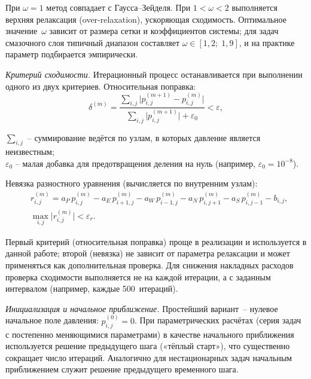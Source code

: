 При $\omega = 1$ метод совпадает с Гаусса–Зейделя. При $1 < \omega < 2$ выполняется верхняя релаксация (over-relaxation), ускоряющая сходимость. Оптимальное значение~$\omega$ зависит от размера сетки и коэффициентов системы; для задач смазочного слоя типичный диапазон составляет $\omega \in [1{,}2;\; 1{,}9]$, и на практике параметр подбирается эмпирически.

\textit{Критерий сходимости.}
Итерационный процесс останавливается при выполнении одного из двух критериев. Относительная поправка:
\begin{equation}\label{eq:convergence_change}
  \delta^{(m)} = \frac{\displaystyle\sum_{i,j} \bigl|p_{i,j}^{(m+1)} - p_{i,j}^{(m)}\bigr|}
       {\displaystyle\sum_{i,j} \bigl|p_{i,j}^{(m+1)}\bigr| + \varepsilon_0} < \varepsilon,
\end{equation}
\begin{conditions}
$\sum_{i,j}$ -- суммирование ведётся по узлам, в которых давление является неизвестным;\\
$\varepsilon_0$ -- малая добавка для предотвращения деления на нуль (например, $\varepsilon_0 = 10^{-8}$).
\end{conditions}
Невязка разностного уравнения (вычисляется по внутренним узлам):
\begin{equation}\label{eq:convergence_residual}
\begin{split}
  &r_{i,j}^{(m)} = a_P\,p_{i,j}^{(m)} - a_E\,p_{i+1,j}^{(m)} - a_W\,p_{i-1,j}^{(m)}
    - a_N\,p_{i,j+1}^{(m)} - a_S\,p_{i,j-1}^{(m)} - b_{i,j}, \\
  &\max_{i,j}\bigl|r_{i,j}^{(m)}\bigr| < \varepsilon_r.
\end{split}
\end{equation}

Первый критерий (относительная поправка) проще в реализации и используется в данной работе; второй (невязка) не зависит от параметра релаксации и может применяться как дополнительная проверка. Для снижения накладных расходов проверка сходимости выполняется не на каждой итерации, а с заданным интервалом (например, каждые 500~итераций).

\textit{Инициализация и начальное приближение.}
Простейший вариант~-- нулевое начальное поле давления: $p^{(0)}_{i,j} = 0$. При параметрических расчётах (серия задач с постепенно меняющимися параметрами) в качестве начального приближения используется решение предыдущего шага («тёплый старт»), что существенно сокращает число итераций. Аналогично для нестационарных задач начальным приближением служит решение предыдущего временного шага.

